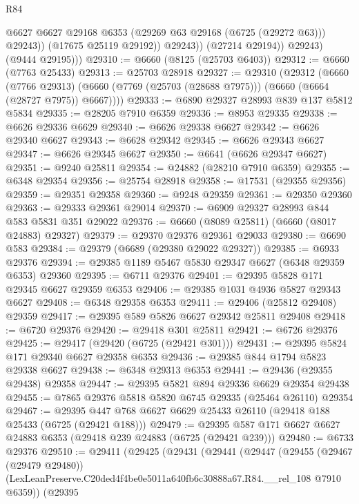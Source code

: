 \begin{lexlean}{R84}
\begin{coremodule}
                      @6627
                      @6627
                      @29168
                      @6353
                      (@29269 @63 @29168 (@6725 (@29272 @63)))
                      @29243))
                  (@17675 @25119 @29192))
                @29243))
            (@27214 @29194))
          @29243)
        (@9444 @29195)))
@29310 := @6660 (@8125 (@25703 @6403))
@29312 := @6660 (@7763 @25433)
@29313 := @25703 @28918
@29327 := @29310
    (@29312
      (@6660
        (@7766 @29313)
        (@6660 (@7769 (@25703 (@28688 @7975))) (@6660 (@6664 (@28727 @7975)) @6667))))
@29333 := @6890 @29327 @28993 @839 @137 @5812 @5834
@29335 := @28205 @7910 @6359
@29336 := @8953 @29335
@29338 := @6626 @29336 @6629
@29340 := @6626 @29338 @6627
@29342 := @6626 @29340 @6627
@29343 := @6628 @29342
@29345 := @6626 @29343 @6627
@29347 := @6626 @29345 @6627
@29350 := @6641 (@6626 @29347 @6627)
@29351 := @9240 @25811
@29354 := @24882 (@28210 @7910 @6359)
@29355 := @6348 @29354
@29356 := @25754 @28918
@29358 := @17531 (@29355 @29356)
@29359 := @29351 @29358
@29360 := @9248 @29359
@29361 := @29350 @29360
@29363 := @29333 @29361 @29014
@29370 := @6909 @29327 @28993 @844 @583 @5831 @351 @29022
@29376 := @6660 (@8089 @25811) (@6660 (@8017 @24883) @29327)
@29379 := @29370 @29376 @29361 @29033
@29380 := @6690 @583
@29384 := @29379 (@6689 (@29380 @29022 @29327))
@29385 := @6933 @29376
@29394 := @29385 @1189 @5467 @5830 @29347 @6627 (@6348 @29359 @6353) @29360
@29395 := @6711 @29376
@29401 := @29395 @5828 @171 @29345 @6627 @29359 @6353
@29406 := @29385 @1031 @4936 @5827 @29343 @6627
@29408 := @6348 @29358 @6353
@29411 := @29406 (@25812 @29408) @29359
@29417 := @29395 @589 @5826 @6627 @29342 @25811 @29408
@29418 := @6720 @29376
@29420 := @29418 @301 @25811
@29421 := @6726 @29376
@29425 := @29417 (@29420 (@6725 (@29421 @301)))
@29431 := @29395 @5824 @171 @29340 @6627 @29358 @6353
@29436 := @29385 @844 @1794 @5823 @29338 @6627
@29438 := @6348 @29313 @6353
@29441 := @29436 (@29355 @29438) @29358
@29447 := @29395 @5821 @894 @29336 @6629 @29354 @29438
@29455 := @7865 @29376 @5818 @5820 @6745 @29335 (@25464 @26110) @29354
@29467 := @29395 @447 @768 @6627 @6629 @25433 @26110 (@29418 @188 @25433 (@6725 (@29421 @188)))
@29479 := @29395 @587 @171 @6627 @6627 @24883 @6353 (@29418 @239 @24883 (@6725 (@29421 @239)))
@29480 := @6733 @29376
@29510 := @29411
    (@29425
      (@29431
        (@29441
          (@29447
            (@29455
              (@29467 (@29479 @29480))
              (LexLeanPreserve.C20ded4f4be0e5011a640fb6c30888a67.R84.__rel_108 @7910 @6359))
            (@29395

\end{coremodule}
\end{lexlean}
